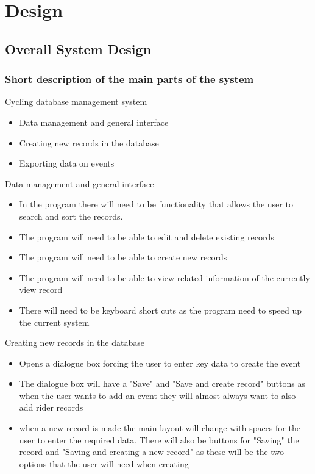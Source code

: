 \chapter{Design}

\section{Overall System Design}

\subsection{Short description of the main parts of the system}

Cycling database management system
\begin{itemize}
	\item Data management and general interface
	\item Creating new records in the database
	\item Exporting data on events
\end{itemize}

Data management and general interface
\begin{itemize}
	\item In the program there will need to be functionality that allows the user to search and sort the records.
	\item The program will need to be able to edit and delete existing records
	\item The program will need to be able to create new records
	\item The program will need to be able to view related information of the currently view record
	\item There will need to be keyboard short cuts as the program need to speed up the current system
\end{itemize}

Creating new records in the database
\begin{itemize}
	\item Opens a dialogue box forcing the user to enter key data to create the event
	\item The dialogue box will have a "Save" and "Save and create record" buttons as when the user wants to add an event they will almost always want to also add rider records
	\item when a new record is made the main layout will change with spaces for the user to enter the required data. There will also be buttons for "Saving" the record and "Saving and creating a new record" as these will be the two options that the user will need when creating 
\end{itemize}

